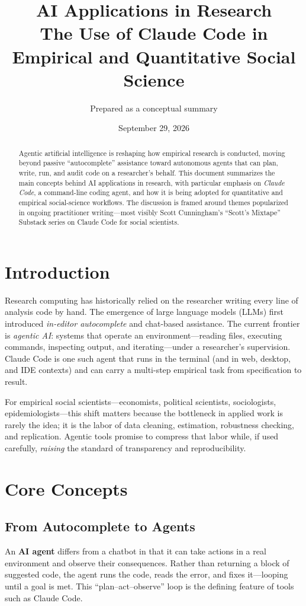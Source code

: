 \documentclass[11pt]{article}
\title{\textbf{AI Applications in Research}\\[0.3em]
       \large The Use of Claude Code in Empirical and Quantitative Social Science}
\author{Prepared as a conceptual summary}
\date{September 29, 2026}
\begin{document}
\maketitle

\begin{abstract}
\noindent
Agentic artificial intelligence is reshaping how empirical research is
conducted, moving beyond passive ``autocomplete'' assistance toward
autonomous agents that can plan, write, run, and audit code on a
researcher's behalf. This document summarizes the main concepts behind
AI applications in research, with particular emphasis on
\emph{Claude Code}, a command-line coding agent, and how it is being
adopted for quantitative and empirical social-science workflows. The
discussion is framed around themes popularized in ongoing practitioner
writing---most visibly Scott Cunningham's ``Scott's Mixtape'' Substack
series on Claude Code for social scientists.
\end{abstract}

\section{Introduction}

Research computing has historically relied on the researcher writing every
line of analysis code by hand. The emergence of large language models
(LLMs) first introduced \emph{in-editor autocomplete} and chat-based
assistance. The current frontier is \emph{agentic AI}: systems that
operate an environment---reading files, executing commands, inspecting
output, and iterating---under a researcher's supervision. Claude Code is
one such agent that runs in the terminal (and in web, desktop, and IDE
contexts) and can carry a multi-step empirical task from specification to
result.

For empirical social scientists---economists, political scientists,
sociologists, epidemiologists---this shift matters because the bottleneck
in applied work is rarely the idea; it is the labor of data cleaning,
estimation, robustness checking, and replication. Agentic tools promise to
compress that labor while, if used carefully, \emph{raising} the standard
of transparency and reproducibility.

\section{Core Concepts}

\subsection{From Autocomplete to Agents}
An \textbf{AI agent} differs from a chatbot in that it can take actions in
a real environment and observe their consequences. Rather than returning a
block of suggested code, the agent runs the code, reads the error, and
fixes it---looping until a goal is met. This ``plan--act--observe'' loop is
the defining feature of tools such as Claude Code.
\end{document}
